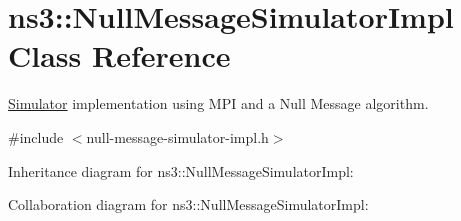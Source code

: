 \hypertarget{classns3_1_1NullMessageSimulatorImpl}{}\section{ns3\+:\+:Null\+Message\+Simulator\+Impl Class Reference}
\label{classns3_1_1NullMessageSimulatorImpl}


\hyperlink{classns3_1_1Simulator}{Simulator} implementation using M\+PI and a Null Message algorithm.  




{\ttfamily \#include $<$null-\/message-\/simulator-\/impl.\+h$>$}



Inheritance diagram for ns3\+:\+:Null\+Message\+Simulator\+Impl\+:


Collaboration diagram for ns3\+:\+:Null\+Message\+Simulator\+Impl\+:
